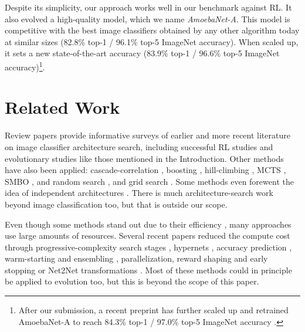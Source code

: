 \documentclass[letterpaper]{article} \usepackage{aaai19}  \usepackage{times}  \usepackage{helvet}  \usepackage{courier}  \usepackage{graphicx}  \frenchspacing
\begin{document}
Despite its simplicity, our approach works well in our benchmark against RL. It also evolved a high-quality model, which we name \mbox{\textit{AmoebaNet-A}}. This model is competitive with the best image classifiers obtained by any other algorithm today at similar sizes (82.8\% top-1 / 96.1\% top-5 ImageNet accuracy). When scaled up, it sets a new state-of-the-art accuracy (83.9\% \mbox{top-1} / 96.6\% \mbox{top-5} ImageNet accuracy)\footnote{After our submission, a recent preprint has further scaled up and retrained \mbox{AmoebaNet-A} to reach 84.3\% \mbox{top-1} / 97.0\% \mbox{top-5} ImageNet accuracy \cite{huang2018gpipe}.}.


\section{Related Work}


Review papers provide informative surveys of earlier \cite{yao1999evolving,floreano2008neuroevolution} and more recent \cite{elsken2018neural} literature on image classifier architecture search, including successful RL studies \cite{zoph2016neural,baker2016designing,zoph2017learning,liu2017progressive,zhong2017practical,cai2017reinforcement} and evolutionary studies like those mentioned in the Introduction. Other methods have also been applied: cascade-correlation \cite{fahlman1990cascade}, boosting \cite{cortes2016adanet}, hill-climbing \cite{elsken2017simple}, MCTS \cite{negrinho2017deeparchitect}, SMBO \cite{mendoza2016towards,liu2017progressive}, and random search \cite{bergstra2012random}, and grid search \cite{zagoruyko2016wide}. Some methods even forewent the idea of independent architectures \cite{saxena2016convolutional}. There is much architecture-search work beyond image classification too, but that is outside our scope.

Even though some methods stand out due to their efficiency \cite{suganuma2017genetic,pham2018faster}, many approaches use large amounts of resources. Several recent papers reduced the compute cost through progressive-complexity search stages \cite{liu2017progressive}, hypernets \cite{brock2017smash}, accuracy prediction \cite{baker2017accelerating,klein2017learning,domhan2015speeding}, warm-starting and ensembling \cite{feurer2015efficient}, parallelization, reward shaping and early stopping \cite{zhong2017practical} or Net2Net transformations \cite{cai2017reinforcement}. Most of these methods could in principle be applied to evolution too, but this is beyond the scope of this paper.
\end{document}

